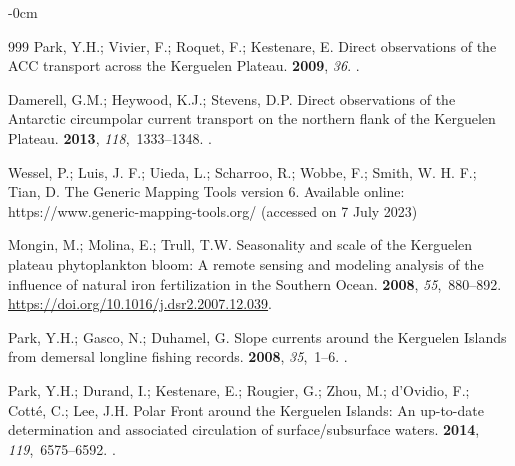 \documentclass[geomatics,article,accept,pdftex,moreauthors]{Definitions/mdpi}
\begin{document}
\begin{adjustwidth}{-\extralength}{0cm}
\begin{thebibliography}{999}
Park, Y.H.; Vivier, F.; Roquet, F.; Kestenare, E.
\newblock Direct observations of the ACC transport across the Kerguelen
  Plateau.
 {\bf 2009}, {\em 36}.
.

Damerell, G.M.; Heywood, K.J.; Stevens, D.P.
\newblock Direct observations of the Antarctic circumpolar current transport on
  the northern flank of the Kerguelen Plateau.
 {\bf 2013}, {\em
  118},~1333--1348.
.

Wessel, P.; Luis, J. F.; Uieda, L.; Scharroo, R.; Wobbe, F.; Smith, W. H. F.; Tian, D.
\newblock The Generic Mapping Tools version 6.
\newblock Available online: https://www.generic-mapping-tools.org/ (accessed on 7 July 2023)


Mongin, M.; Molina, E.; Trull, T.W.
\newblock Seasonality and scale of the Kerguelen plateau phytoplankton bloom: A
  remote sensing and modeling analysis of the influence of natural iron
  fertilization in the Southern Ocean.
 {\bf
  2008}, {\em 55},~880--892. {\url{https://doi.org/10.1016/j.dsr2.2007.12.039}}. %
    
Park, Y.H.; Gasco, N.; Duhamel, G.
\newblock Slope currents around the Kerguelen Islands from demersal longline
  fishing records.
 {\bf 2008}, \emph{35},~1--6. %
.

Park, Y.H.; Durand, I.; Kestenare, E.; Rougier, G.; Zhou, M.; d'Ovidio, F.;
  Cotté, C.; Lee, J.H.
\newblock Polar Front around the Kerguelen Islands: An up-to-date determination
  and associated circulation of surface/subsurface waters.
 {\bf 2014}, {\em
  119},~6575--6592.
.


\end{thebibliography}
\end{adjustwidth}
\end{document}
